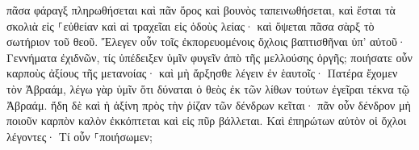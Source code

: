 \documentclass{openreader}
\begin{document}
πᾶσα φάραγξ πληρωθήσεται καὶ πᾶν ὄρος καὶ βουνὸς ταπεινωθήσεται, καὶ ἔσται τὰ σκολιὰ εἰς ⸀εὐθείαν καὶ αἱ τραχεῖαι εἰς ὁδοὺς λείας· 
καὶ ὄψεται πᾶσα σὰρξ τὸ σωτήριον τοῦ θεοῦ. 
Ἔλεγεν οὖν τοῖς ἐκπορευομένοις ὄχλοις βαπτισθῆναι ὑπ’ αὐτοῦ· Γεννήματα ἐχιδνῶν, τίς ὑπέδειξεν ὑμῖν φυγεῖν ἀπὸ τῆς μελλούσης ὀργῆς; 
ποιήσατε οὖν καρποὺς ἀξίους τῆς μετανοίας· καὶ μὴ ἄρξησθε λέγειν ἐν ἑαυτοῖς· Πατέρα ἔχομεν τὸν Ἀβραάμ, λέγω γὰρ ὑμῖν ὅτι δύναται ὁ θεὸς ἐκ τῶν λίθων τούτων ἐγεῖραι τέκνα τῷ Ἀβραάμ. 
ἤδη δὲ καὶ ἡ ἀξίνη πρὸς τὴν ῥίζαν τῶν δένδρων κεῖται· πᾶν οὖν δένδρον μὴ ποιοῦν καρπὸν καλὸν ἐκκόπτεται καὶ εἰς πῦρ βάλλεται. 
Καὶ ἐπηρώτων αὐτὸν οἱ ὄχλοι λέγοντες· Τί οὖν ⸀ποιήσωμεν; 
\end{document}
